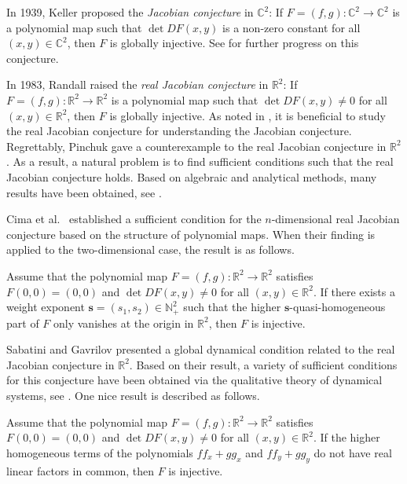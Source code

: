\documentclass[reqno]{amsart}
\begin{document}
In 1939, Keller \cite{bib 18} proposed the \emph{Jacobian conjecture} in
$\mathbb{C}^2$: If $F=(f,g):\mathbb{C}^2 \to \mathbb{C}^2$ is a polynomial map such 
that $ \det DF(x,y)$ is a non-zero constant for all $(x,y)\in \mathbb{C}^2$, 
then $ F $ is globally injective. See \cite{bib 4, bib 24, bib 26, bib 27} for 
further progress on this conjecture.

In 1983, Randall \cite{bib 22} raised the \emph{real Jacobian conjecture} in 
$\mathbb{R}^2$: If $F=(f,g):\mathbb{R}^2 \to \mathbb{R}^2$ is a polynomial map such 
that $ \det DF(x,y)\neq 0 $ for all $(x,y)\in \mathbb{R}^2$, then $ F $ is globally 
injective. As noted in \cite{bib 12,bib 26},  it is  beneficial to study the real 
Jacobian conjecture for understanding the Jacobian conjecture. Regrettably, 
Pinchuk \cite{bib 21} gave a counterexample to the real Jacobian conjecture in 
$\mathbb{R}^2$. As a result, a natural problem is to find sufficient conditions such 
that the real Jacobian conjecture holds. Based on algebraic and analytical methods, 
many results have been obtained, see \cite{bib 28, bib 6, bib 9, bib 13, bib 15, bib 17}. 

Cima et al.\ \cite{bib 11, bib 12} established a sufficient condition for the 
$n$-dimensional real Jacobian conjecture based on the structure of polynomial maps. 
When their finding is applied to the two-dimensional case, the result is as follows.

\begin{theorem} \label{th1.1}
Assume that the polynomial map $F=(f,g):\mathbb{R}^2 \to \mathbb{R}^2$ satisfies 
$ F(0,0)=(0,0) $ and $ \det DF(x,y)\neq 0 $ for all $ (x,y)\in \mathbb{R}^2 $. 
If there exists a weight exponent $\mathbf{s}=(s_1,s_2)\in \mathbb{N}_{+}^{2}$
such that the higher $\mathbf{s}$-quasi-homogeneous part of $F$ only vanishes at 
the origin in $\mathbb{R}^2$, then $F$ is injective.
\end{theorem}

Sabatini \cite{bib 23} and Gavrilov \cite{bib 16} presented a global dynamical condition 
related to the real Jacobian conjecture in \(\mathbb{R}^2\). 
Based on their result, a variety of sufficient conditions for this conjecture 
have been obtained via the qualitative theory of dynamical systems, 
see \cite{bib 7, bib 8, bib 10, bib 20, bib 25}. 
One nice result is described as follows.

\begin{theorem} \label{th1.2}
Assume that the polynomial map $F=(f,g):\mathbb{R}^2 \to \mathbb{R}^2$ satisfies $ F(0,0)=(0,0) $ and $ \det DF(x,y)\neq 0 $ for all $ (x, y)\in \mathbb{R}^2 $. If the higher homogeneous terms of the polynomials $ ff_{x}+gg_{x} $ and $ ff_{y}+gg_{y} $ do not have real linear factors in common, then $F$ is injective.
\end{theorem}
\end{document}
